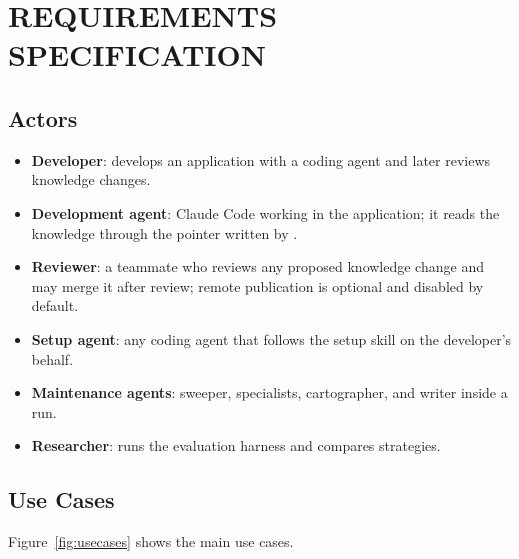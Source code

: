 \chapter{REQUIREMENTS SPECIFICATION}

\section{Actors}

\begin{itemize}[nosep]
  \item \textbf{Developer}: develops an application with a coding agent and later reviews knowledge changes.
  \item \textbf{Development agent}: Claude Code working in the application; it reads the knowledge through the pointer written by .
  \item \textbf{Reviewer}: a teammate who reviews any proposed knowledge change and may merge it after review; remote publication is optional and disabled by default.
  \item \textbf{Setup agent}: any coding agent that follows the setup skill on the developer's behalf.
  \item \textbf{Maintenance agents}: sweeper, specialists, cartographer, and writer inside a run.
  \item \textbf{Researcher}: runs the evaluation harness and compares strategies.
\end{itemize}

\section{Use Cases}

Figure~\ref{fig:usecases} shows the main use cases.

